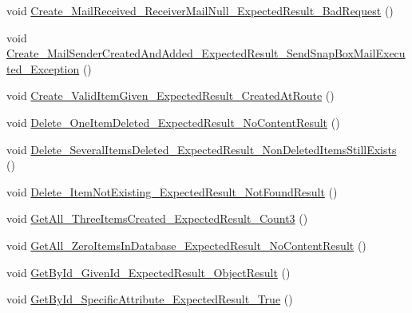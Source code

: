 \begin{DoxyCompactItemize}
\item 
void \mbox{\hyperlink{class_web_api_1_1_unit_1_1_test_1_1_controller_tests_1_1_u_t___snap_box_controller_ac96b88af7b85c67fd487864289b2a84e}{Create\+\_\+\+Mail\+Received\+\_\+\+Receiver\+Mail\+Null\+\_\+\+Expected\+Result\+\_\+\+Bad\+Request}} ()
\item 
void \mbox{\hyperlink{class_web_api_1_1_unit_1_1_test_1_1_controller_tests_1_1_u_t___snap_box_controller_acfdbd04462fbb47660a9a71b5db644d1}{Create\+\_\+\+Mail\+Sender\+Created\+And\+Added\+\_\+\+Expected\+Result\+\_\+\+Send\+Snap\+Box\+Mail\+Executed\+\_\+\+Exception}} ()
\item 
void \mbox{\hyperlink{class_web_api_1_1_unit_1_1_test_1_1_controller_tests_1_1_u_t___snap_box_controller_afb05a8bfbbcd6ae82b196c3c3973e7bb}{Create\+\_\+\+Valid\+Item\+Given\+\_\+\+Expected\+Result\+\_\+\+Created\+At\+Route}} ()
\item 
void \mbox{\hyperlink{class_web_api_1_1_unit_1_1_test_1_1_controller_tests_1_1_u_t___snap_box_controller_a08e2625511d7aedc155c90279f09bf1b}{Delete\+\_\+\+One\+Item\+Deleted\+\_\+\+Expected\+Result\+\_\+\+No\+Content\+Result}} ()
\item 
void \mbox{\hyperlink{class_web_api_1_1_unit_1_1_test_1_1_controller_tests_1_1_u_t___snap_box_controller_a27c6335ff818e0959e4668a0f8d47aef}{Delete\+\_\+\+Several\+Items\+Deleted\+\_\+\+Expected\+Result\+\_\+\+Non\+Deleted\+Items\+Still\+Exists}} ()
\item 
void \mbox{\hyperlink{class_web_api_1_1_unit_1_1_test_1_1_controller_tests_1_1_u_t___snap_box_controller_a11757a04ec53b6819f341c169ff7cec1}{Delete\+\_\+\+Item\+Not\+Existing\+\_\+\+Expected\+Result\+\_\+\+Not\+Found\+Result}} ()
\item 
void \mbox{\hyperlink{class_web_api_1_1_unit_1_1_test_1_1_controller_tests_1_1_u_t___snap_box_controller_af2c62e3379625e1d889ba408cae8ddd6}{Get\+All\+\_\+\+Three\+Items\+Created\+\_\+\+Expected\+Result\+\_\+\+Count3}} ()
\item 
void \mbox{\hyperlink{class_web_api_1_1_unit_1_1_test_1_1_controller_tests_1_1_u_t___snap_box_controller_aec141ab157e32a24dbc85cf8434bfbea}{Get\+All\+\_\+\+Zero\+Items\+In\+Database\+\_\+\+Expected\+Result\+\_\+\+No\+Content\+Result}} ()
\item 
void \mbox{\hyperlink{class_web_api_1_1_unit_1_1_test_1_1_controller_tests_1_1_u_t___snap_box_controller_a0101057c6d82b40dd0a768afc741b10f}{Get\+By\+Id\+\_\+\+Given\+Id\+\_\+\+Expected\+Result\+\_\+\+Object\+Result}} ()
\item 
void \mbox{\hyperlink{class_web_api_1_1_unit_1_1_test_1_1_controller_tests_1_1_u_t___snap_box_controller_aa546b27edc3569eb4bc189a2e59c343e}{Get\+By\+Id\+\_\+\+Specific\+Attribute\+\_\+\+Expected\+Result\+\_\+\+True}} ()
\end{DoxyCompactItemize}
